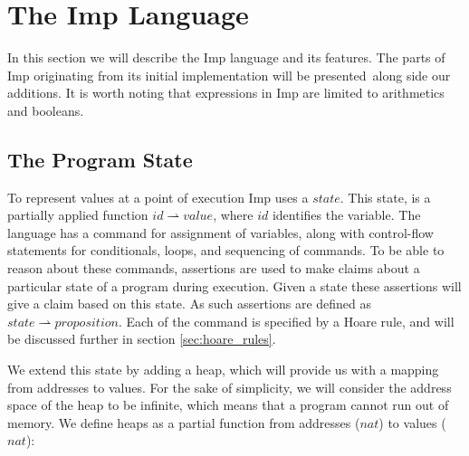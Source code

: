 \section{The Imp Language}
\label{sec:background_imp}
In this section we will describe the Imp language and its features. The parts of Imp originating from its initial implementation will be presented\,\cite{Pierce:SF} along side our additions. It is worth noting that expressions in Imp are limited to arithmetics and booleans.

\subsection{The Program State}
To represent values at a point of execution Imp uses a $state$. This state, is a partially applied function $id \rightharpoonup value$, where $id$ identifies the variable. The language has a command for assignment of variables, along with control-flow statements for conditionals, loops, and sequencing of commands. To be able to reason about these commands, assertions are used to make claims about a particular state of a program during execution. Given a state these assertions will give a claim based on this state. As such assertions are defined as $state \rightharpoonup proposition$. Each of the command is specified by a Hoare rule, and will be discussed further in section \ref{sec:hoare_rules}.

We extend this state by adding a heap, which will provide us with a mapping from addresses to values. For the sake of simplicity, we will consider the address space of the heap to be infinite, which means that a program cannot run out of memory. We define heaps as a partial function from addresses ($nat$) to values ($nat$):

